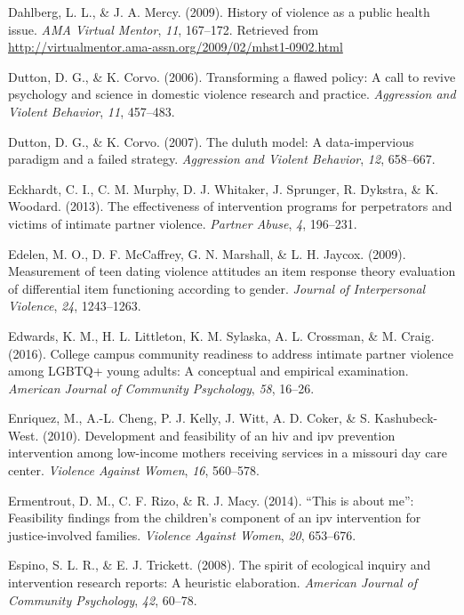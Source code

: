 \documentclass[11pt,]{tufte-book}
\begin{document}
\hypertarget{ref-dahlberg2009history}{}
Dahlberg, L. L., \& J. A. Mercy. (2009). History of violence as a public
health issue. \emph{AMA Virtual Mentor}, \emph{11}, 167--172. Retrieved
from \url{http://virtualmentor.ama-assn.org/2009/02/mhst1-0902.html}

\hypertarget{ref-dutton2006transforming}{}
Dutton, D. G., \& K. Corvo. (2006). Transforming a flawed policy: A call
to revive psychology and science in domestic violence research and
practice. \emph{Aggression and Violent Behavior}, \emph{11}, 457--483.

\hypertarget{ref-dutton2007duluth}{}
Dutton, D. G., \& K. Corvo. (2007). The duluth model: A data-impervious
paradigm and a failed strategy. \emph{Aggression and Violent Behavior},
\emph{12}, 658--667.

\hypertarget{ref-eckhardt2013effectiveness}{}
Eckhardt, C. I., C. M. Murphy, D. J. Whitaker, J. Sprunger, R. Dykstra,
\& K. Woodard. (2013). The effectiveness of intervention programs for
perpetrators and victims of intimate partner violence. \emph{Partner
Abuse}, \emph{4}, 196--231.

\hypertarget{ref-edelen2009measurement}{}
Edelen, M. O., D. F. McCaffrey, G. N. Marshall, \& L. H. Jaycox. (2009).
Measurement of teen dating violence attitudes an item response theory
evaluation of differential item functioning according to gender.
\emph{Journal of Interpersonal Violence}, \emph{24}, 1243--1263.

\hypertarget{ref-edwards2016college}{}
Edwards, K. M., H. L. Littleton, K. M. Sylaska, A. L. Crossman, \& M.
Craig. (2016). College campus community readiness to address intimate
partner violence among LGBTQ+ young adults: A conceptual and empirical
examination. \emph{American Journal of Community Psychology}, \emph{58},
16--26.

\hypertarget{ref-enriquez2010development}{}
Enriquez, M., A.-L. Cheng, P. J. Kelly, J. Witt, A. D. Coker, \& S.
Kashubeck-West. (2010). Development and feasibility of an hiv and ipv
prevention intervention among low-income mothers receiving services in a
missouri day care center. \emph{Violence Against Women}, \emph{16},
560--578.

\hypertarget{ref-ermentrout2014this}{}
Ermentrout, D. M., C. F. Rizo, \& R. J. Macy. (2014). ``This is about
me'': Feasibility findings from the children's component of an ipv
intervention for justice-involved families. \emph{Violence Against
Women}, \emph{20}, 653--676.

\hypertarget{ref-espino2008spirit}{}
Espino, S. L. R., \& E. J. Trickett. (2008). The spirit of ecological
inquiry and intervention research reports: A heuristic elaboration.
\emph{American Journal of Community Psychology}, \emph{42}, 60--78.
\end{document}
